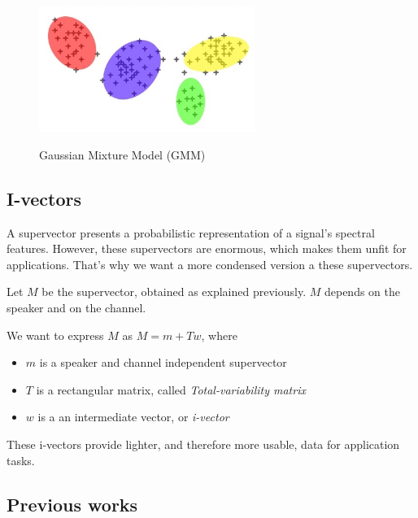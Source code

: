 \documentclass[conference]{IEEEtran}
\begin{document}
\begin{figure}[!h]
    \centering
    \caption{Gaussian Mixture Model (GMM)}
    \includegraphics[width=7cm]{GMM.jpg}
    \label{gmm}
\end{figure}

\subsection{I-vectors}


A supervector presents a probabilistic representation of a signal's spectral features. 
However, these supervectors are enormous, which makes them unfit for applications.
That's why we want a more condensed version a these supervectors.


Let $M$ be the supervector, obtained as explained previously. $M$ depends on the speaker and on the channel. 


We want to express $M$ as $M = m + Tw$, where
\begin{itemize}
\item $m$ is a speaker and channel independent supervector
\item $T$ is a rectangular matrix, called \emph{Total-variability matrix}
\item $w$ is a an intermediate vector, or \emph{i-vector}
\end{itemize}

These i-vectors provide lighter, and therefore more usable, data for application tasks.

\subsection{Previous works}
\end{document}
